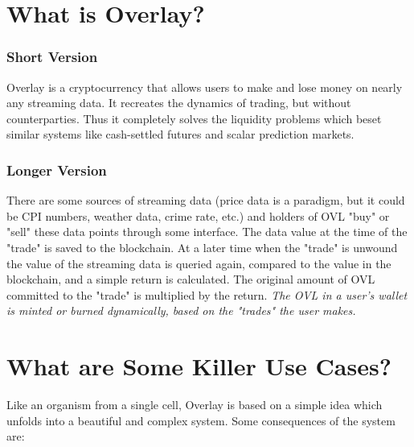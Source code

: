 \documentclass[11pt]{article}
\begin{document}
    \section{What is Overlay?}\label{what-is-overlay}

    \subsubsection{Short Version}\label{short-version}

Overlay is a cryptocurrency that allows users to make and lose money on
nearly any streaming data. It recreates the dynamics of trading, but
without counterparties. Thus it completely solves the liquidity problems
which beset similar systems like cash-settled futures and scalar
prediction markets.

    \subsubsection{Longer Version}\label{longer-version}

There are some sources of streaming data (price data is a paradigm, but
it could be CPI numbers, weather data, crime rate, etc.) and holders of
OVL "buy" or "sell" these data points through some interface. The data
value at the time of the "trade" is saved to the blockchain. At a later
time when the "trade" is unwound the value of the streaming data is
queried again, compared to the value in the blockchain, and a simple
return is calculated. The original amount of OVL committed to the
"trade" is multiplied by the return. \emph{The OVL in a user's wallet is
minted or burned dynamically, based on the "trades" the user makes.}

    \section{What are Some Killer Use
Cases?}\label{what-are-some-killer-use-cases}

    Like an organism from a single cell, Overlay is based on a simple idea
which unfolds into a beautiful and complex system. Some consequences of
the system are:
\end{document}
